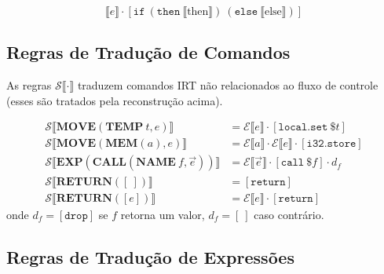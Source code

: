 \[
  \llbracket e \rrbracket \cdot [\mathtt{if}\ (\mathtt{then}\ \llbracket\text{then}\rrbracket)\ (\mathtt{else}\ \llbracket\text{else}\rrbracket)]
\]

\subsection{Regras de Tradução de Comandos}\label{subsec:trans-stmts}

As regras $\mathcal{S}\llbracket \cdot \rrbracket$ traduzem comandos IRT não
relacionados ao fluxo de controle (esses são tratados pela reconstrução acima).

\begin{Definition}\label{def:trans-stmts}
\begin{align*}
\mathcal{S}\llbracket \mathbf{MOVE}(\mathbf{TEMP}\ t, e) \rrbracket
  &= \mathcal{E}\llbracket e \rrbracket \cdot [\mathtt{local.set}\ \$t] \\
\mathcal{S}\llbracket \mathbf{MOVE}(\mathbf{MEM}(a), e) \rrbracket
  &= \mathcal{E}\llbracket a \rrbracket \cdot \mathcal{E}\llbracket e \rrbracket \cdot [\mathtt{i32.store}] \\
\mathcal{S}\llbracket \mathbf{EXP}(\mathbf{CALL}(\mathbf{NAME}\ f, \vec{e})) \rrbracket
  &= \mathcal{E}\llbracket \vec{e} \rrbracket \cdot [\mathtt{call}\ \$f] \cdot d_f \\
\mathcal{S}\llbracket \mathbf{RETURN}([\ ]) \rrbracket
  &= [\mathtt{return}] \\
\mathcal{S}\llbracket \mathbf{RETURN}([e]) \rrbracket
  &= \mathcal{E}\llbracket e \rrbracket \cdot [\mathtt{return}]
\end{align*}
onde $d_f = [\mathtt{drop}]$ se $f$ retorna um valor, $d_f = [\ ]$ caso contrário.
\end{Definition}

\subsection{Regras de Tradução de Expressões}\label{subsec:trans-exprs}


